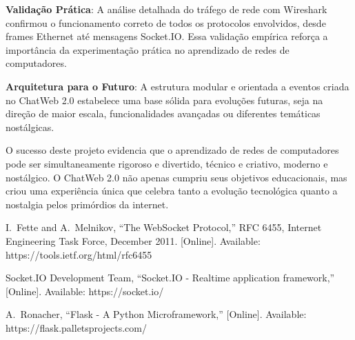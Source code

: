 \documentclass[conference,compsoc]{IEEEtran}
\begin{document}
\begin{otherlanguage}{brazil}
\textbf{Validação Prática}: A análise detalhada do tráfego de rede com Wireshark confirmou o funcionamento correto de todos os protocolos envolvidos, desde frames Ethernet até mensagens Socket.IO. Essa validação empírica reforça a importância da experimentação prática no aprendizado de redes de computadores.

\textbf{Arquitetura para o Futuro}: A estrutura modular e orientada a eventos criada no ChatWeb 2.0 estabelece uma base sólida para evoluções futuras, seja na direção de maior escala, funcionalidades avançadas ou diferentes temáticas nostálgicas.

O sucesso deste projeto evidencia que o aprendizado de redes de computadores pode ser simultaneamente rigoroso e divertido, técnico e criativo, moderno e nostálgico. O ChatWeb 2.0 não apenas cumpriu seus objetivos educacionais, mas criou uma experiência única que celebra tanto a evolução tecnológica quanto a nostalgia pelos primórdios da internet.



%
%
%
\begin{thebibliography}{9}

I.~Fette and A.~Melnikov, ``The WebSocket Protocol,'' RFC 6455, 
Internet Engineering Task Force, December 2011. [Online]. Available: 
https://tools.ietf.org/html/rfc6455

Socket.IO Development Team, ``Socket.IO - Realtime application framework,'' 
[Online]. Available: https://socket.io/

A.~Ronacher, ``Flask - A Python Microframework,'' 
[Online]. Available: https://flask.palletsprojects.com/


\end{thebibliography}
\end{otherlanguage}
\end{document}
